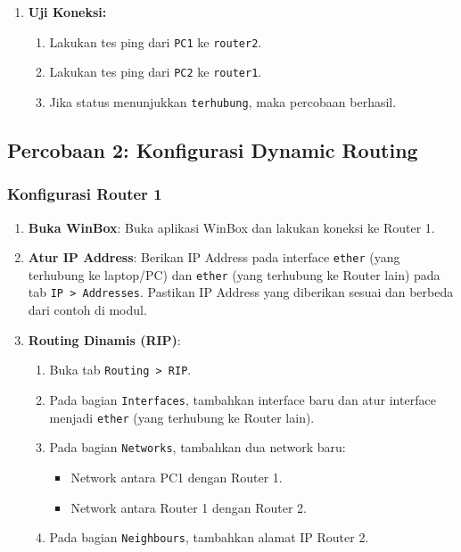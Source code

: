 \begin{enumerate}
    \item \textbf{Uji Koneksi:}
    \begin{enumerate}
        \item Lakukan tes ping dari \texttt{PC1} ke \texttt{router2}.
        \item Lakukan tes ping dari \texttt{PC2} ke \texttt{router1}.
        \item Jika status menunjukkan \texttt{terhubung}, maka percobaan berhasil.
    \end{enumerate}
\end{enumerate}

\subsection*{Percobaan 2: Konfigurasi Dynamic Routing}

\subsubsection*{Konfigurasi Router 1}

\begin{enumerate}
    \item \textbf{Buka WinBox}: Buka aplikasi WinBox dan lakukan koneksi ke Router 1.
    \item \textbf{Atur IP Address}: Berikan IP Address pada interface \texttt{ether} (yang terhubung ke laptop/PC) dan \texttt{ether} (yang terhubung ke Router lain) pada tab \texttt{IP > Addresses}. Pastikan IP Address yang diberikan sesuai dan berbeda dari contoh di modul.
    \item \textbf{Routing Dinamis (RIP)}:
    \begin{enumerate}
        \item Buka tab \texttt{Routing > RIP}.
        \item Pada bagian \texttt{Interfaces}, tambahkan interface baru dan atur interface menjadi \texttt{ether} (yang terhubung ke Router lain).
        \item Pada bagian \texttt{Networks}, tambahkan dua network baru:
        \begin{itemize}
            \item Network antara PC1 dengan Router 1.
            \item Network antara Router 1 dengan Router 2.
        \end{itemize}
        \item Pada bagian \texttt{Neighbours}, tambahkan alamat IP Router 2.
    \end{enumerate}
\end{enumerate}

